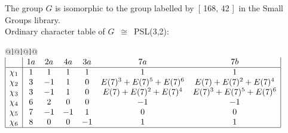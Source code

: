 \documentclass[varwidth=\maxdimen,border=10]{standalone}
\begin{document}
The group $G$ is isomorphic to the group labelled by\ [ 168, 42 ]\ in the Small Groups library.\\
Ordinary character table of $G$\ $\cong$\ PSL(3,2):\\
\begin{center}
\begin{tabular}{@{}l@{}l@{}l@{}}
\hline
\(\begin{array}{|l|cccccc|}
  & 1a & 2a & 4a & 3a & 7a & 7b\\ \hline
\chi_{1} & 1 & 1 & 1 & 1 & 1 & 1\\
\chi_{2} & 3 & -1 & 1 & 0 & E(7)^{3}+E(7)^{5}+E(7)^{6} & E(7)+E(7)^{2}+E(7)^{4}\\
\chi_{3} & 3 & -1 & 1 & 0 & E(7)+E(7)^{2}+E(7)^{4} & E(7)^{3}+E(7)^{5}+E(7)^{6}\\
\chi_{4} & 6 & 2 & 0 & 0 & -1 & -1\\
\chi_{5} & 7 & -1 & -1 & 1 & 0 & 0\\
\chi_{6} & 8 & 0 & 0 & -1 & 1 & 1\\
\hline
\end{array}\)\\
\end{tabular}
\end{center}
\end{document}
